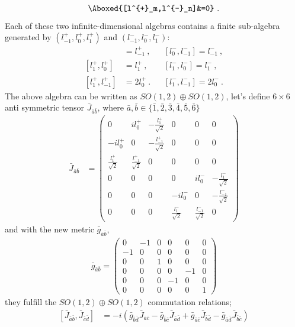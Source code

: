 \documentclass[]{article}
\numberwithin{equation}{section}
\begin{document}
{{\begin{align}
    \Aboxed{[l^{+}_m,l^{-}_n]&=0}~.
\end{align}
Each of these two infinite-dimensional algebras contains a finite sub-algebra generated by $(l^{+}_{-1},l^{+}_{0},l^{+}_{1})$ and $(l^{-}_{-1},l^{-}_{0},l^{-}_{1})$:
 \begin{align}
     [l^{+}_0,l^{+}_{-1}]&=l^{+}_{-1}~,&&[l^{-}_0,l^{-}_{-1}]=l^{-}_{-1}~,\\
     [l^{+}_1,l^{+}_{0}]&=l^{+}_{1}~,&&[l^{-}_1,l^{-}_{0}]=l^{-}_{1}~,\\
     [l^{+}_1,l^{+}_{-1}]&=2l^{+}_{0}~.&&[l^{-}_1,l^{-}_{-1}]=2l^{-}_{0}~.
 \end{align}
 The above algebra can be written as $SO(1,2)\oplus SO(1,2)$, let's define $6\times6$ anti symmetric tensor $\bar{J}_{\bar{a}\bar{b}}$, where $\bar{a},\bar{b}\in\{\bar{1},\bar{2},\bar{3},\bar{4},\bar{5},\bar{6}\}$
 \begin{align}
     \bar{J}_{\bar{a}\bar{b}}&=\begin{pmatrix}
         0 & il_{0}^{+}& -\frac{l_{1}^{+}}{\sqrt{2}}&0&0&0\\
         -il_{0}^{+}&0& -\frac{l_{-1}^{+}}{\sqrt{2}}&0&0&0\\
          \frac{l_{1}^{+}}{\sqrt{2}}& \frac{l_{-1}^{+}}{\sqrt{2}} &0&0&0&0\\
         0&0&0&0 & il_{0}^{-}& -\frac{l_{1}^{-}}{\sqrt{2}}\\
          0&0&0&-il_{0}^{-}&0& -\frac{l_{-1}^{-}}{\sqrt{2}}\\
           0&0&0 &\frac{l_{1}^{-}}{\sqrt{2}}& \frac{l_{-1}^{-}}{\sqrt{2}} &0
     \end{pmatrix}
 \end{align}
 and with the new metric $\bar{g}_{\bar{a}\bar{b}}$,
\begin{align}
    \bar{g}_{\bar{a}\bar{b}}= \begin{pmatrix}
            0&-1&0&0&0&0\\
            -1&0&0&0&0&0\\
            0&0&1&0&0&0\\
            0&0&0&0&-1&0\\
            0&0&0&-1&0&0\\
            0&0&0&0&0&1
            \end{pmatrix}
\end{align}
they fulfill the $SO(1,2)\oplus SO(1,2)$ commutation relations;
\begin{align}
      \left[\bar{J}_{\bar{a}\bar{b}},\bar{J}_{\bar{c}\bar{d}}\right]&=-i\left(\bar{g}_{\bar{b}\bar{d}}\bar{J}_{\bar{a}\bar{c}}-\bar{g}_{\bar{b}\bar{c}}\bar{J}_{\bar{a}\bar{d}}+\bar{g}_{\bar{a}\bar{c}}\bar{J}_{\bar{b}\bar{d}}-\bar{g}_{\bar{a}\bar{d}}\bar{J}_{\bar{b}\bar{c}}\right)

\end{align}}}
\end{document}

